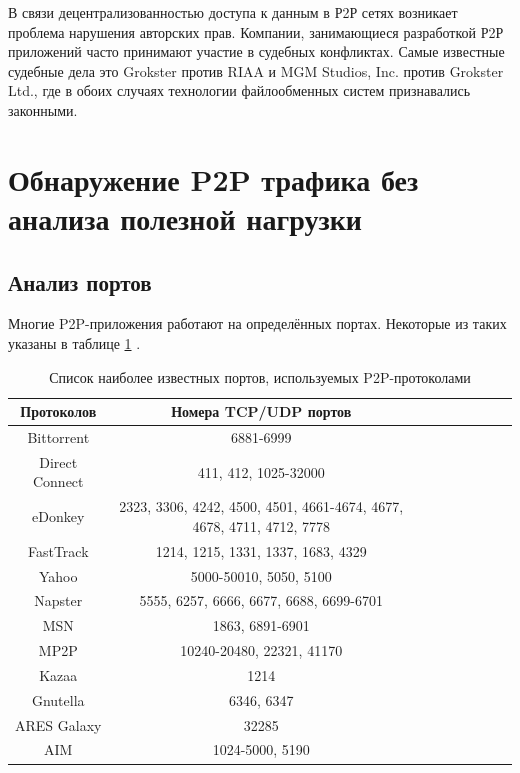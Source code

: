 \documentclass[bachelor, och, coursework]{SCWorks}
\begin{document}
В связи децентрализованностью доступа к данным в Р2Р сетях возникает проблема нарушения авторских прав. 
Компании, занимающиеся разработкой Р2Р приложений часто принимают участие в судебных конфликтах. 
Самые известные судебные дела это Grokster против RIAA и MGM Studios, Inc. против Grokster Ltd., 
где в обоих случаях технологии файлообменных систем признавались законными.

\section{Обнаружение P2P трафика без анализа полезной нагрузки}
\subsection{Анализ портов}
Многие P2P-приложения работают на определённых портах. 
Некоторые из таких указаны в таблице \ref{table:p2p-ports} \cite{p2p-list}.

\begin{table}[H]
    \caption{Список наиболее известных портов, используемых P2P-протоколами}
    \label{table:p2p-ports}
    \begin{center}
    {\small
    \begin{tabular}{|c|c|c|c|c|c|c|c|c|}
        \hline
    Протоколов   & Номера TCP/UDP портов \\ \hline
    Bittorrent      & 6881-6999  \\ \hline
    Direct Connect  & 411, 412, 1025-32000  \\ \hline
    eDonkey         & 2323, 3306, 4242, 4500, 4501, 4661-4674, 4677, 4678, 4711, 4712, 7778  \\ \hline
    FastTrack       & 1214, 1215, 1331, 1337, 1683, 4329  \\ \hline
    Yahoo           & 5000-50010, 5050, 5100  \\ \hline
    Napster         & 5555, 6257, 6666, 6677, 6688, 6699-6701  \\ \hline
    MSN             & 1863, 6891-6901 \\ \hline
    MP2P            & 10240-20480, 22321, 41170  \\ \hline
    Kazaa           & 1214  \\ \hline
    Gnutella        & 6346, 6347  \\ \hline
    ARES Galaxy     & 32285  \\ \hline
    AIM             & 1024-5000, 5190  \\ \hline
    \end{tabular}
    }
    \end{center}
\end{table}
\end{document}
